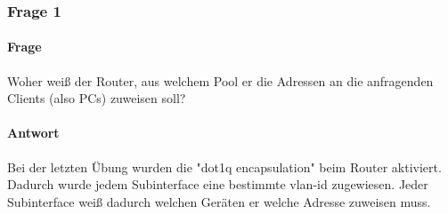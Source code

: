 \subsubsection{Frage 1}
\paragraph{Frage}
Woher weiß der Router, aus welchem Pool er die Adressen an die
anfragenden Clients (also PCs) zuweisen soll?
\paragraph{Antwort}
Bei der letzten Übung wurden die "dot1q encapsulation" beim Router aktiviert. Dadurch wurde jedem Subinterface eine bestimmte vlan-id zugewiesen. Jeder Subinterface weiß dadurch welchen Geräten er welche Adresse zuweisen muss.